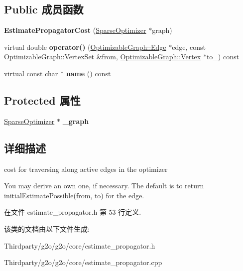 \subsection*{Public 成员函数}
\begin{DoxyCompactItemize}
\item 
\hypertarget{classg2o_1_1EstimatePropagatorCost_aebd56e3597a99b225bc3799ec8145bc9}{{\bfseries Estimate\-Propagator\-Cost} (\hyperlink{classg2o_1_1SparseOptimizer}{Sparse\-Optimizer} $\ast$graph)}\label{classg2o_1_1EstimatePropagatorCost_aebd56e3597a99b225bc3799ec8145bc9}

\item 
\hypertarget{classg2o_1_1EstimatePropagatorCost_abbff40e061153f9049a40514c44b4492}{virtual double {\bfseries operator()} (\hyperlink{classg2o_1_1OptimizableGraph_1_1Edge}{Optimizable\-Graph\-::\-Edge} $\ast$edge, const Optimizable\-Graph\-::\-Vertex\-Set \&from, \hyperlink{classg2o_1_1OptimizableGraph_1_1Vertex}{Optimizable\-Graph\-::\-Vertex} $\ast$to\-\_\-) const }\label{classg2o_1_1EstimatePropagatorCost_abbff40e061153f9049a40514c44b4492}

\item 
\hypertarget{classg2o_1_1EstimatePropagatorCost_a302b70a2b5d83d4ae5863f4b88742589}{virtual const char $\ast$ {\bfseries name} () const }\label{classg2o_1_1EstimatePropagatorCost_a302b70a2b5d83d4ae5863f4b88742589}

\end{DoxyCompactItemize}
\subsection*{Protected 属性}
\begin{DoxyCompactItemize}
\item 
\hypertarget{classg2o_1_1EstimatePropagatorCost_adf778ed8de5b54eb934e88107fe77980}{\hyperlink{classg2o_1_1SparseOptimizer}{Sparse\-Optimizer} $\ast$ {\bfseries \-\_\-graph}}\label{classg2o_1_1EstimatePropagatorCost_adf778ed8de5b54eb934e88107fe77980}

\end{DoxyCompactItemize}


\subsection{详细描述}
cost for traversing along active edges in the optimizer 

You may derive an own one, if necessary. The default is to return initial\-Estimate\-Possible(from, to) for the edge. 

在文件 estimate\-\_\-propagator.\-h 第 53 行定义.



该类的文档由以下文件生成\-:\begin{DoxyCompactItemize}
\item 
Thirdparty/g2o/g2o/core/estimate\-\_\-propagator.\-h\item 
Thirdparty/g2o/g2o/core/estimate\-\_\-propagator.\-cpp\end{DoxyCompactItemize}
